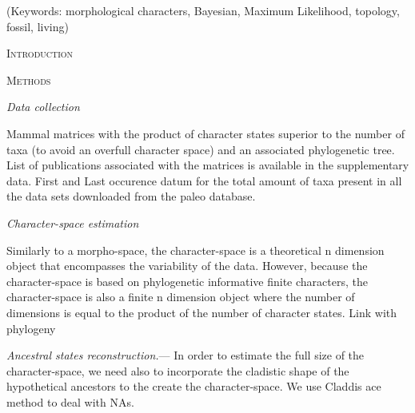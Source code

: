 \documentclass[12pt,letterpaper]{article}
\renewcommand{\section}[1]{%
\bigskip
\begin{center}
\begin{Large}
\normalfont\scshape #1
\medskip
\end{Large}
\end{center}}
\renewcommand{\subsection}[1]{%
\bigskip
\begin{center}
\begin{large}
\normalfont\itshape #1
\end{large}
\end{center}}
\renewcommand{\subsubsection}[1]{%
\vspace{2ex}
\noindent
\textit{#1.}---}
\begin{document}
\noindent (Keywords: morphological characters, Bayesian, Maximum Likelihood, topology, fossil, living)\\

\vspace{1.5in}

\newpage 

%
%

\section{Introduction}

%
%

\section{Methods}
\subsection{Data collection}
Mammal matrices with the product of character states superior to the number of taxa (to avoid an overfull character space) and an associated phylogenetic tree.
List of publications associated with the matrices is available in the supplementary data.
First and Last occurence datum for the total amount of taxa present in all the data sets downloaded from the paleo database.

\subsection{Character-space estimation}
Similarly to a morpho-space, the character-space is a theoretical n dimension object that encompasses the variability of the data. However, because the character-space is based on phylogenetic informative finite characters, the character-space is also a finite n dimension object where the number of dimensions is equal to the product of the number of character states. Link with phylogeny

\subsubsection{Ancestral states reconstruction}
In order to estimate the full size of the character-space, we need also to incorporate the cladistic shape of the hypothetical ancestors to the create the character-space.
We use Claddis ace method to deal with NAs.
\end{document}
